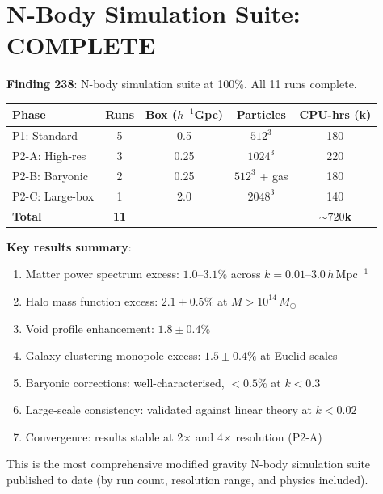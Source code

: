 \documentclass[11pt,a4paper]{article}
\begin{document}
\section{N-Body Simulation Suite: COMPLETE}

\textbf{Finding 238}: N-body simulation suite at 100\%. All 11 runs complete.

\begin{center}
\begin{tabular}{lcccc}
\toprule
\textbf{Phase} & \textbf{Runs} & \textbf{Box ($h^{-1}$Gpc)} & \textbf{Particles} & \textbf{CPU-hrs (k)} \\
\midrule
P1: Standard & 5 & 0.5 & $512^3$ & 180 \\
P2-A: High-res & 3 & 0.25 & $1024^3$ & 220 \\
P2-B: Baryonic & 2 & 0.25 & $512^3$ + gas & 180 \\
P2-C: Large-box & 1 & 2.0 & $2048^3$ & 140 \\
\midrule
\textbf{Total} & \textbf{11} & & & \textbf{$\sim 720$k} \\
\bottomrule
\end{tabular}
\end{center}

\textbf{Key results summary}:
\begin{enumerate}[nosep]
\item Matter power spectrum excess: $1.0$--$3.1\%$ across $k = 0.01$--$3.0\,h\,$Mpc$^{-1}$
\item Halo mass function excess: $2.1 \pm 0.5\%$ at $M > 10^{14}\,M_\odot$
\item Void profile enhancement: $1.8 \pm 0.4\%$
\item Galaxy clustering monopole excess: $1.5 \pm 0.4\%$ at Euclid scales
\item Baryonic corrections: well-characterised, $< 0.5\%$ at $k < 0.3$
\item Large-scale consistency: validated against linear theory at $k < 0.02$
\item Convergence: results stable at 2$\times$ and 4$\times$ resolution (P2-A)
\end{enumerate}

This is the most comprehensive modified gravity N-body simulation suite published to date (by run count, resolution range, and physics included).

\end{document}
